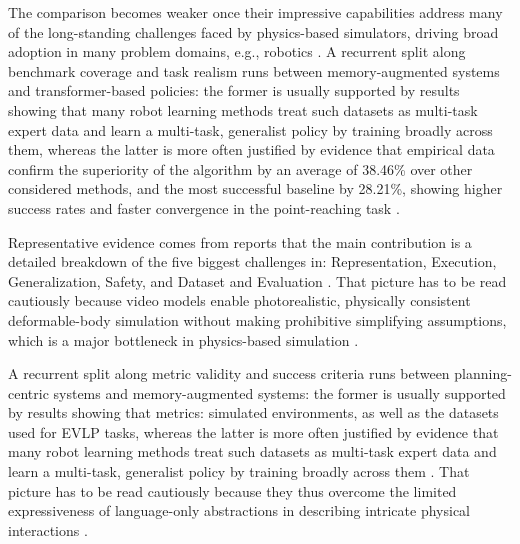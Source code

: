 \documentclass[a4paper,11pt]{article}
\begin{document}
The comparison becomes weaker once their impressive capabilities address many of the long-standing challenges faced by physics-based simulators, driving broad adoption in many problem domains, e.g., robotics \citep{Mei2026Video}. A recurrent split along benchmark coverage and task realism runs between memory-augmented systems and transformer-based policies: the former is usually supported by results showing that many robot learning methods treat such datasets as multi-task expert data and learn a multi-task, generalist policy by training broadly across them, whereas the latter is more often justified by evidence that empirical data confirm the superiority of the algorithm by an average of 38.46\% over other considered methods, and the most successful baseline by 28.21\%, showing higher success rates and faster convergence in the point-reaching task \citep{Memmel2024Strap,Makarova2025Conther}.

Representative evidence comes from reports that the main contribution is a detailed breakdown of the five biggest challenges in: Representation, Execution, Generalization, Safety, and Dataset and Evaluation \citep{Xu2025Anatomy}. That picture has to be read cautiously because video models enable photorealistic, physically consistent deformable-body simulation without making prohibitive simplifying assumptions, which is a major bottleneck in physics-based simulation \citep{Mei2026Video}.

A recurrent split along metric validity and success criteria runs between planning-centric systems and memory-augmented systems: the former is usually supported by results showing that metrics: simulated environments, as well as the datasets used for EVLP tasks, whereas the latter is more often justified by evidence that many robot learning methods treat such datasets as multi-task expert data and learn a multi-task, generalist policy by training broadly across them \citep{Francis2021Core,Francis2023Core,Memmel2024Strap}. That picture has to be read cautiously because they thus overcome the limited expressiveness of language-only abstractions in describing intricate physical interactions \citep{Mei2026Video}.
\end{document}
